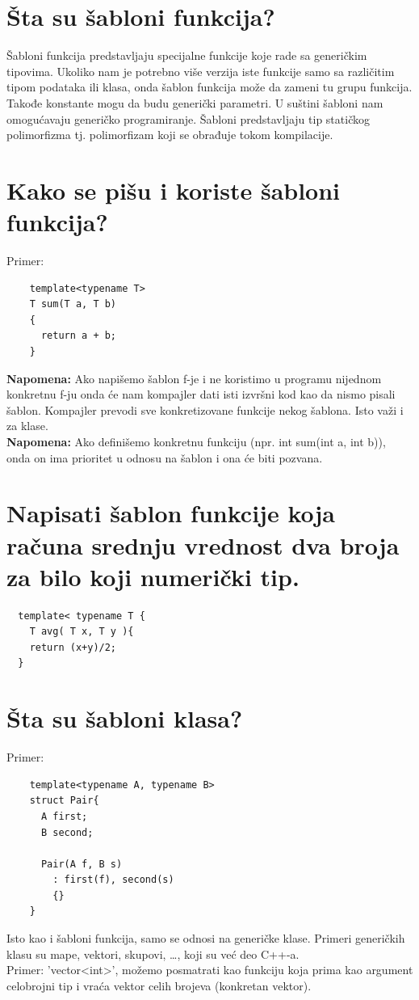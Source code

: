 \documentclass[a4paper]{article}
\begin{document}
\section{Šta su šabloni funkcija?}
    Šabloni funkcija predstavljaju specijalne funkcije koje rade sa generičkim tipovima. 
    Ukoliko nam je potrebno više verzija iste funkcije samo sa različitim tipom podataka ili klasa, 
    onda šablon funkcija može da zameni tu grupu funkcija. Takođe konstante mogu da budu generički 
    parametri. U suštini šabloni nam omogućavaju generičko programiranje. Šabloni predstavljaju tip 
    statičkog polimorfizma tj. polimorfizam koji se obrađuje tokom kompilacije.\cite{cppref_templates}

\section{Kako se pišu i koriste šabloni funkcija?}
  Primer:
  \begin{lstlisting}
    template<typename T> 
    T sum(T a, T b)
    {
      return a + b;
    }\end{lstlisting}
  \textbf{Napomena:} Ako napišemo šablon f-je i ne koristimo u programu nijednom konkretnu f-ju
  onda će nam kompajler dati isti izvršni kod kao da nismo pisali šablon. Kompajler prevodi 
  sve konkretizovane funkcije nekog šablona. Isto važi i za klase. \\
  \textbf{Napomena:} Ako definišemo konkretnu funkciju (npr. int sum(int a, int b)), onda on ima 
  prioritet u odnosu na šablon i ona će biti pozvana.

\section{Napisati šablon funkcije koja računa srednju vrednost dva broja za bilo koji numerički tip.}
\begin{lstlisting}
  template< typename T {
    T avg( T x, T y ){
    return (x+y)/2;
  }\end{lstlisting}

\section{Šta su šabloni klasa?}
  Primer:
  \begin{lstlisting}
    template<typename A, typename B>
    struct Pair{
      A first;
      B second;
    
      Pair(A f, B s)
        : first(f), second(s)
        {}
    }\end{lstlisting}
  Isto kao i šabloni funkcija, samo se odnosi na generičke klase. Primeri generičkih klasu su mape, 
  vektori, skupovi, \dots, koji su već deo C++-a. \\
  \indent Primer: 'vector<int>', možemo posmatrati kao funkciju 
  koja prima kao argument celobrojni tip i vraća vektor celih brojeva (konkretan vektor).
\end{document}
